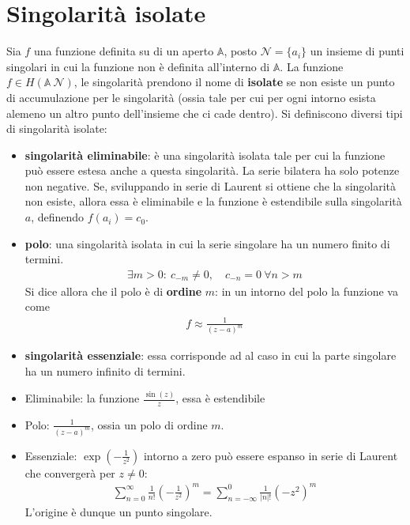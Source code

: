 \documentclass[a4paper, oneside]{article}
\begin{document}
\section{Singolarità isolate}
Sia $f$ una funzione definita su di un aperto $\mathbb{A}$, posto 
$\mathcal{N} = \{a_i\}$ un insieme di punti singolari in cui la funzione non è 
definita all'interno di $\mathbb{A}$. La funzione 
$f \in H(\mathbb{A} \ \mathcal{N})$, le singolarità prendono il nome
di \textbf{isolate} se non esiste un punto di accumulazione per le singolarità 
(ossia tale per cui per ogni intorno esista alemeno un altro punto dell'insieme
che ci cade dentro). Si definiscono diversi tipi di singolarità isolate:
\begin{itemize}
    \item  \textbf{singolarità eliminabile}: è una singolarità
isolata tale per cui la funzione può essere estesa anche a questa singolarità. La serie bilatera
ha solo potenze non negative. Se, sviluppando in serie di Laurent si ottiene che
la singolarità non esiste, allora essa è eliminabile e la funzione è estendibile
sulla singolarità $a$, definendo $f(a_i) = c_0$.
    \item \textbf{polo}: una singolarità isolata in cui la serie singolare ha 
    un numero finito di termini. 
    \begin{align}
        \exists m > 0 : \ c_{-m} \neq 0, \quad c_{-n} = 0 \ \forall n > m
    \end{align}
    Si dice allora che il polo è di \textbf{ordine} $m$: in un intorno del polo
    la funzione va come 
    \begin{gather*}
        f \approx \frac{1}{(z - a)^{m}}
    \end{gather*}
    \item \textbf{singolarità essenziale}: essa corrisponde ad al caso in 
    cui la parte singolare ha un numero infinito di termini. 
\end{itemize}
\begin{example}[Singolarità]
    \begin{itemize}
        \item Eliminabile: la funzione $\frac{\sin(z)}{z}$, 
        essa è estendibile 
        \item Polo: $\frac{1}{(z - a)^{m}}$, ossia un polo di ordine $m$.
        \item Essenziale: $\exp\left(-\frac{1}{z^{2}}\right)$ intorno a zero 
        può essere espanso in serie di Laurent che convergerà per $z \neq 0$:
        \begin{gather*}
            \sum_{n = 0}^{\infty } \frac{1}{n!} \left(- \frac{1}{z^{2}}\right) ^{m} = \sum_{n = -\infty }^{0} \frac{1}{\left| n \right|! } \left(-z^{2}\right)^{m}
        \end{gather*}
        L'origine è dunque un punto singolare.
    \end{itemize}
\end{example}
\end{document}
